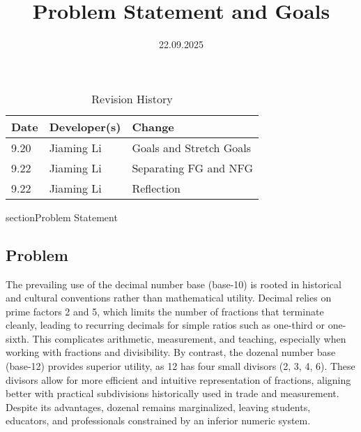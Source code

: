 \documentclass{article}
\title{Problem Statement and Goals\\\progname}
\author{\authname}{Ammar Sharbat & Jiaming Li}
\date{22.09.2025}
\begin{document}
    \maketitle

    \begin{table}[hp]
        \caption{Revision History} \label{TblRevisionHistory}
        \begin{tabularx}{\textwidth}{llX}
            \toprule
            \textbf{Date} & \textbf{Developer(s)} & \textbf{Change}\\
            \midrule
            9.20 & Jiaming Li & Goals and Stretch Goals\\
            9.22 & Jiaming Li & Separating FG and NFG\\
            9.22 & Jiaming Li & Reflection\\
            \bottomrule
        \end{tabularx}
    \end{table}

    section{Problem Statement}

    \subsection{Problem}
    The prevailing use of the decimal number base (base-10) is rooted in historical 
    and cultural conventions rather than mathematical utility. Decimal relies on prime 
    factors 2 and 5, which limits the number of fractions that terminate cleanly, 
    leading to recurring decimals for simple ratios such as one-third or one-sixth. 
    This complicates arithmetic, measurement, and teaching, especially when working 
    with fractions and divisibility. By contrast, the dozenal number base (base-12) 
    provides superior utility, as 12 has four small divisors (2, 3, 4, 6). These 
    divisors allow for more efficient and intuitive representation of fractions, 
    aligning better with practical subdivisions historically used in trade and 
    measurement. Despite its advantages, dozenal remains marginalized, leaving 
    students, educators, and professionals constrained by an inferior numeric system.
\end{document}
